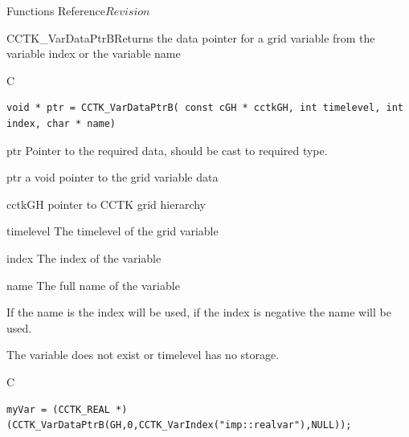 \begin{cactuspart}{ Functions Reference}{}{$Revision$}
\begin{FunctionDescription}{CCTK\_VarDataPtrB}{Returns the data pointer for a grid variable from the variable index or the variable name}
\label{CCTK-VarDataPtrB}
\begin{SynopsisSection}
\begin{Synopsis}{C}
\begin{verbatim}void * ptr = CCTK_VarDataPtrB( const cGH * cctkGH, int timelevel, int index, char * name)\end{verbatim}
\end{Synopsis}
\end{SynopsisSection}
\begin{ResultSection}
\begin{Result}{ptr}
Pointer to the required data, should be cast to required type.
\end{Result}
\end{ResultSection}
\begin{ParameterSection}
\begin{Parameter}{ptr}
a void pointer to the grid variable data
\end{Parameter}
\begin{Parameter}{cctkGH}
pointer to CCTK grid hierarchy
\end{Parameter}
\begin{Parameter}{timelevel}
The timelevel of the grid variable
\end{Parameter}
\begin{Parameter}{index}
The index of the variable
\end{Parameter}
\begin{Parameter}{name}
The full name of the variable
\end{Parameter}
\end{ParameterSection}
\begin{Discussion}
If the name is  the index will be used, if the index is negative the name will be used.
\end{Discussion}
\begin{ErrorSection}
\begin{Error}{}
The variable does not exist or timelevel has no storage.
\end{Error}
\end{ErrorSection}
\begin{ExampleSection}
\begin{Example}{C}
\begin{verbatim}
myVar = (CCTK_REAL *)(CCTK_VarDataPtrB(GH,0,CCTK_VarIndex("imp::realvar"),NULL));
\end{verbatim}
\end{Example}
\end{ExampleSection}
\end{FunctionDescription}



\end{cactuspart}
